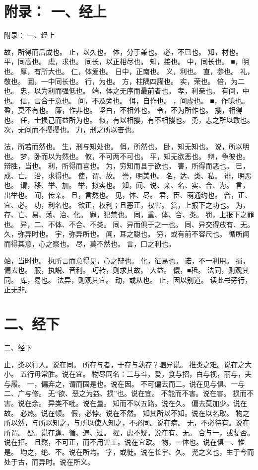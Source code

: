 \documentclass[12pt,UTF8]{ctexbook}
\begin{document}
\chapter{附录： 一、经上}

附录： 一、经上

故，所得而后成也。 
止，以久也。 
体，分于兼也。 
必，不已也。 
知，材也。 
平，同高也。 
虑，求也。 
同长，以正相尽也。 
知，接也。 
中，同长也。 
■，明也。 
厚，有所大也。 
仁，体爱也。 
日中，正南也。 
义，利也。 
直，参也。 
礼，敬也。 
圜，一中同长也。 
行，为也。 
方，柱隅四讙也。 
实，荣也。 
倍，为二也。 
忠，以为利而强低也。 
端，体之无序而最前者也。 
孝，利亲也。 
有间，中也。 
信，言合于意也。 
间，不及旁也。 
佴，自作也。 
，间虚也。 
■，作嗛也。 
盈，莫不有也。 
廉，作非也。 
坚白，不相外也。 
令，不为所作也。 
撄，相得也。 
任，士损己而益所为也。 
似，有以相撄，有不相撄也。 
勇，志之所以敢也。 
次，无间而不撄撄也。 
力，刑之所以奋也。 

法，所若而然也。 
生，刑与知处也。 
佴，所然也。 
卧，知无知也。 
说，所以明也。 
梦，卧而以为然也。 
攸，不可两不可也。 
平，知无欲恶也。 
辩，争彼也。辩胜，当也。 
利，所得而喜也。 
为，穷知而县于欲也。 
害，所得而恶也。 
已，成、亡。 
治，求得也。 
使，谓、故。 
誉，明美也。 
名，达、类、私。 
诽，明恶也。 
谓，移、举、加。 
举，拟实也。 
知，闻、说、亲、名、实、合、为。 
言，出举也。 
闻，传亲。 
且，言然也。 
见，体、尽。 
君，臣、萌通约也。 
合，正、宜、必。 
功，利名也。 
欲正，权利；且恶正，权害。 
赏，上报下之功也。 
为，存、亡、易、荡、治、化。 
罪，犯禁也。 
同，重、体、合、类。 
罚，上报下之罪也。 
异，二、不体、不合、不类。 
同、异而俱于之一也。 
同、异交得放有、无。 
久，弥异时也。 
宇，弥异所也。 
闻，耳之聪也。 
穷，或有前不容尺也。 
循所闻而得其意，心之察也。 
尽，莫不然也。 
言，口之利也。 

始，当时也。 
执所言而意得见，心之辩也。 
化，征易也。 
诺，不一利用。 
损，偏去也。 
服，执誽、音利。 
巧转，则求其故。 
大益。 
儇，■秪。 
法同，则观其同。 
库，易也。 
法异，则观其宜。 
动，或从也。 
止，因以别道。 
读此书旁行，正无非。 


\chapter{二、经下}

二、经下

止，类以行人。说在同。 
所存与者，于存与孰存？驷异说。 
推类之难。说在之大小。 
五行毋常胜。说在宜。 
物尽同名：二与斗，爱，食与招，白与视，丽与，夫与履。 
一，偏弃之，谓而固是也。说在因。 
不可偏去而二。说在见与俱、一与二、广与修。 
无“欲、恶之为益、损”也。说在宜。 
不能而不害。说在害。 
损而不害。说在余。 
异类不吡。说在量。 
知而不以五路。说在久。 
偏去莫加少。说在故。 
必热。说在顿。 
假，必悖。说在不然。 
知其所以不知。说在以名取。 
物之所以然，与所以知之，与所以使人知之，不必同。说在病。 
无，不必待有。说在所谓。 
疑。说在逢、循、遇、过。 
擢，虑不疑。说在有、无。 
合与一，或复否。说在拒。 
且然，不可正，而不用害工。说在宜欧。 
物，一体也。说在俱一、惟是。 
均之，绝、不。说在所均。 
字，或徙。说在长宇、久。 
尧之义也，生于今而处于古，而异时。说在所义。 
\end{document}
